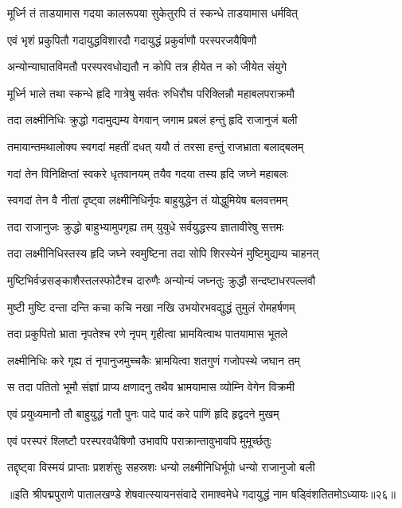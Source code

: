 \twolineshloka
{मूर्ध्नि तं ताडयामास गदया कालरूपया}
{सुकेतुरपि तं स्कन्धे ताडयामास धर्मवित्}%

\twolineshloka
{एवं भृशं प्रकुपितौ गदायुद्धविशारदौ}
{गदायुद्धं प्रकुर्वाणौ परस्परजयैषिणौ}%

\twolineshloka
{अन्योन्याघातविमतौ परस्परवधोद्यतौ}
{न कोपि तत्र हीयेत न को जीयेत संयुगे}%

\twolineshloka
{मूर्ध्नि भाले तथा स्कन्धे हृदि गात्रेषु सर्वतः}
{रुधिरौघ परिक्लिन्नौ महाबलपराक्रमौ}%

\twolineshloka
{तदा लक्ष्मीनिधिः क्रुद्धो गदामुद्यम्य वेगवान्}
{जगाम प्रबलं हन्तुं हृदि राजानुजं बली}%

\twolineshloka
{तमायान्तमथालोक्य स्वगदां महतीं दधत्}
{ययौ तं तरसा हन्तुं राजभ्राता बलाद्बलम्}%

\twolineshloka
{गदां तेन विनिक्षिप्तां स्वकरे धृतवानयम्}
{तयैव गदया तस्य हृदि जघ्ने महाबलः}%

\twolineshloka
{स्वगदां तेन वै नीतां दृष्ट्वा लक्ष्मीनिधिर्नृपः}
{बाहुयुद्धेन तं योद्धुमियेष बलवत्तमम्}%

\twolineshloka
{तदा राजानुजः क्रुद्धो बाहुभ्यामुपगृह्य तम्}
{युयुधे सर्वयुद्धस्य ज्ञातावीरेषु सत्तमः}%

\twolineshloka
{तदा लक्ष्मीनिधिस्तस्य हृदि जघ्ने स्वमुष्टिना}
{तदा सोपि शिरस्येनं मुष्टिमुद्यम्य चाहनत्}%

\twolineshloka
{मुष्टिभिर्वज्रसङ्काशैस्तलस्फोटैश्च दारुणैः}
{अन्योन्यं जघ्नतुः क्रुद्धौ सन्दष्टाधरपल्लवौ}%

\twolineshloka
{मुष्टी मुष्टि दन्ता दन्ति कचा कचि नखा नखि}
{उभयोरभवद्युद्धं तुमुलं रोमहर्षणम्}%

\twolineshloka
{तदा प्रकुपितो भ्राता नृपतेश्च रणे नृपम्}
{गृहीत्वा भ्रामयित्वाथ पातयामास भूतले}%

\twolineshloka
{लक्ष्मीनिधिः करे गृह्य तं नृपानुजमुच्चकैः}
{भ्रामयित्वा शतगुणं गजोपस्थे जघान तम्}%

\twolineshloka
{स तदा पतितो भूमौ संज्ञां प्राप्य क्षणादनु}
{तथैव भ्रामयामास व्योम्नि वेगेन विक्रमी}%

\twolineshloka
{एवं प्रयुध्यमानौ तौ बाहुयुद्धं गतौ पुनः}
{पादे पादं करे पाणिं हृदि हृद्वदने मुखम्}%

\twolineshloka
{एवं परस्परं श्लिष्टौ परस्परवधैषिणौ}
{उभावपि पराक्रान्तावुभावपि मुमूर्च्छतुः}%

\twolineshloka
{तद्दृष्ट्वा विस्मयं प्राप्ताः प्रशशंसुः सहस्रशः}
{धन्यो लक्ष्मीनिधिर्भूपो धन्यो राजानुजो बली}%

{॥इति श्रीपद्मपुराणे पातालखण्डे शेषवात्स्यायनसंवादे रामाश्वमेधे गदायुद्धं नाम षड्विंशतितमोऽध्यायः॥२६॥}

